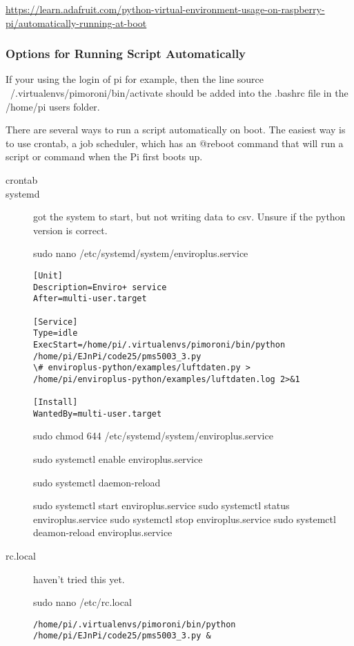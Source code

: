 \documentclass{article}
\begin{document}
\url{https://learn.adafruit.com/python-virtual-environment-usage-on-raspberry-pi/automatically-running-at-boot}

\subsubsection{Options for Running Script Automatically}

If your using the login of pi for example, then the line source ~/.virtualenvs/pimoroni/bin/activate should be added into the .bashrc file in the /home/pi users folder.

There are several ways to run a script automatically on boot. The easiest way is to use crontab, a job scheduler, which has an @reboot command that will run a script or command when the Pi first boots up.

\begin{description}
\item[crontab]
\item[systemd] got the system to start, but not writing data to csv. Unsure if the python version is correct.


sudo nano /etc/systemd/system/enviroplus.service

\begin{verbatim}
[Unit]
Description=Enviro+ service
After=multi-user.target

[Service]
Type=idle
ExecStart=/home/pi/.virtualenvs/pimoroni/bin/python /home/pi/EJnPi/code25/pms5003_3.py
\# enviroplus-python/examples/luftdaten.py > /home/pi/enviroplus-python/examples/luftdaten.log 2>&1

[Install]
WantedBy=multi-user.target
\end{verbatim}

sudo chmod 644 /etc/systemd/system/enviroplus.service

sudo systemctl enable enviroplus.service

sudo systemctl daemon-reload


sudo systemctl start enviroplus.service
sudo systemctl status enviroplus.service
sudo systemctl stop enviroplus.service
sudo systemctl deamon-reload enviroplus.service



\item[rc.local] haven't tried this yet.

sudo nano /etc/rc.local

\begin{verbatim}
/home/pi/.virtualenvs/pimoroni/bin/python /home/pi/EJnPi/code25/pms5003_3.py &
\end{verbatim}

\end{description}
\end{document}
